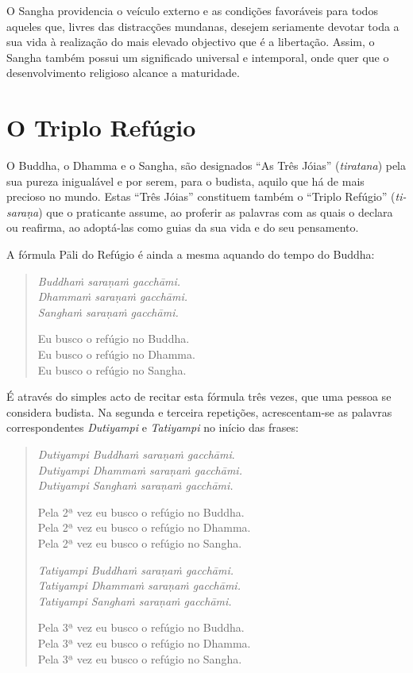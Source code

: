 O Sangha providencia o veículo externo e as condições favoráveis para
todos aqueles que, livres das distracções mundanas, desejem seriamente devotar
toda a sua vida à realização do mais elevado objectivo que é a libertação.
Assim, o Sangha também possui um significado universal e intemporal, onde
quer que o desenvolvimento religioso alcance a maturidade.

\section{O Triplo Refúgio}

O Buddha, o Dhamma e o Sangha, são designados ``As Três Jóias''
(\emph{tiratana}) pela sua pureza inigualável e por serem, para o budista,
aquilo que há de mais precioso no mundo. Estas ``Três Jóias'' constituem também
o ``Triplo Refúgio'' (\emph{ti-saraṇa}) que o praticante assume, ao proferir as
palavras com as quais o declara ou reafirma, ao adoptá-las como guias da sua
vida e do seu pensamento.

A fórmula Pāli do Refúgio é ainda a mesma aquando do tempo do Buddha:

\begin{verse}
  \emph{Buddhaṁ saraṇaṁ gacchāmi.}\\
  \emph{Dhammaṁ saraṇaṁ gacchāmi.}\\
  \emph{Sanghaṁ saraṇaṁ gacchāmi.}

  Eu busco o refúgio no Buddha.\\
  Eu busco o refúgio no Dhamma.\\
  Eu busco o refúgio no Sangha.
\end{verse}

É através do simples acto de recitar esta fórmula três vezes, que uma pessoa se
considera budista. Na segunda e terceira repetições, acrescentam-se as palavras
correspondentes \emph{Dutiyampi} e \emph{Tatiyampi} no início das frases:

\begin{verse}
  \emph{Dutiyampi Buddhaṁ saraṇaṁ gacchāmi}.\\
  \emph{Dutiyampi Dhammaṁ saraṇaṁ gacchāmi.}\\
  \emph{Dutiyampi Sanghaṁ saraṇaṁ gacchāmi.}

  Pela 2ª vez eu busco o refúgio no Buddha.\\
  Pela 2ª vez eu busco o refúgio no Dhamma.\\
  Pela 2ª vez eu busco o refúgio no Sangha.

  \emph{Tatiyampi Buddhaṁ saraṇaṁ gacchāmi.}\\
  \emph{Tatiyampi Dhammaṁ saraṇaṁ gacchāmi.}\\
  \emph{Tatiyampi Sanghaṁ saraṇaṁ gacchāmi.}

  Pela 3ª vez eu busco o refúgio no Buddha.\\
  Pela 3ª vez eu busco o refúgio no Dhamma.\\
  Pela 3ª vez eu busco o refúgio no Sangha.
\end{verse}

